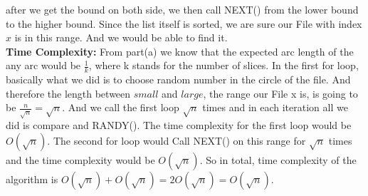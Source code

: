 \documentclass[14pt]{article}
\begin{document}
\begin{enumerate}
\begin{itemize}
    after we get the bound on both side, we then call NEXT() from the lower bound
    to the higher bound. Since the list itself is sorted, we are sure our File with
    index $x$ is in this range. And we would be able to find it.\\
    \textbf{Time Complexity:} From part(a) we know that the expected arc length of the 
    any arc would be $\frac{1}{k}$, where k stands for the number of slices. In the
    first for loop, basically what we did is to choose random number in the circle
    of the file. And therefore the length between $small$ and $large$, the range
    our File x is, is going to be $\frac{n}{\sqrt{n}} = \sqrt{n}$. And we call the
    first loop $\sqrt{n}$ times and in each iteration all we did is compare and RANDY().
    The time complexity for the first loop would be $O(\sqrt{n})$. The second for
    loop would Call NEXT() on this range for $\sqrt{n}$ times and the time 
    complexity would be $O(\sqrt{n})$. So in total, time complexity of the algorithm
    is $O(\sqrt{n}) + O(\sqrt{n}) = 2O(\sqrt{n}) = O(\sqrt{n})$.
    \end{itemize}
    

\end{enumerate}
\end{document}
